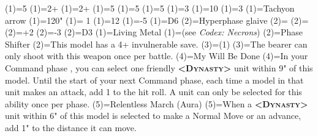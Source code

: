 \renewcommand{\UnitName}{Overlord }%
\renewcommand{\UnitPower}{5}%
\renewcommand{\UnitIcon}{HQ.svg}%
%
\renewcommand{\StatBlocks}{1}%
\Movement(1)={5}%
\WeaponSkill(1)={2+}%
\BalisticSkill(1)={2+}%
\Strength(1)={5}%
\Toughness(1)={5}%
\Wounds(1)={5}%
\Attacks(1)={3}%
\Leadership(1)={10}%
\Save(1)={3}%
%
\renewcommand{\UnitText}{1 \UnitName equipped with: \WeaponName(1); \WeaponName(2).}%
%
%
\renewcommand{\NumWeapon}{2}%
\WeaponName(1)={Tachyon arrow}%
\WeaponRange(1)={120"}%
\WeaponType(1)={ 1}%
\WeaponStrength(1)={12}%
\WeaponAP(1)={-5}%
\WeaponDamage(1)={D6}%
%
\WeaponName(2)={Hyperphase glaive}%
\WeaponRange(2)={}%
\WeaponType(2)={}%
\WeaponStrength(2)={+2}%
\WeaponAP(2)={-3}%
\WeaponDamage(2)={D3}%
%
\renewcommand{\NumAbilities}{3}%
\AbilityName(1)={Living Metal}%
\AbilityDescription(1)={(see \textit{Codex: Necrons})}%
%
\AbilityName(2)={Phase Shifter}%
\AbilityDescription(2)={This model has a 4+ invulnerable save.}%
%
\AbilityName(3)={\WeaponName(1)}%
\AbilityDescription(3)={The bearer can only shoot with this weapon once per battle.}%
%
\AbilityName(4)={My Will Be Done}%
\AbilityDescription(4)={In your Command phase , you can select one friendly \textsc{\textbf{<Dynasty>}} unit within 9" of this model. Until the start of your next Command phase, each time a model in that unit makes an attack, add 1 to the hit roll. A unit can only be selected for this ability once per phase.}%
%
\AbilityName(5)={Relentless March (Aura)}%
\AbilityDescription(5)={When a \textsc{\textbf{<Dynasty>}} unit within 6" of this model is selected to make a Normal Move or an advance, add 1" to the distance it can move.}%
%
\renewcommand{\FactionKeywords}{Necrons, <Dynasty>}%
\renewcommand{\Keywords}{Infantry, Character, Noble, \UnitName}%
\newcommand{\ExtraFrontTitle}{\AbilityName(5)}%
\renewcommand{\ExtraFrontText}{\AbilityDescription(5)}%
\newcommand{\ExtraBackTitle}{\AbilityName(4)}%
\renewcommand{\ExtraBackText}{\AbilityDescription(4)}%
\endinput%